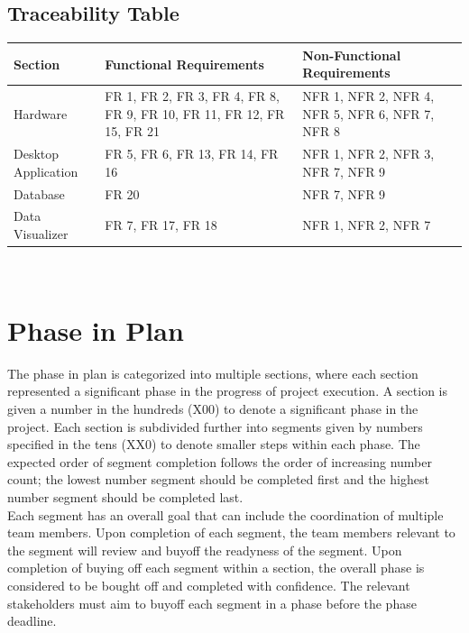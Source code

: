 \documentclass[12pt]{article}
\begin{document}
\subsection{Traceability Table}

  \begin{tabular}{| p{} | p{}| p{}|}
    \hline
    \rowcolor[gray]{0.9}
    Section & Functional Requirements & Non-Functional Requirements\\
    \hline
    Hardware & FR 1, FR 2, FR 3, FR 4, FR 8, FR 9, FR 10, FR 11, FR 12, FR 15, FR 21 & NFR 1, NFR 2, NFR 4, NFR  5, NFR 6, NFR 7, NFR 8 \\
    \hline
    Desktop Application & FR 5, FR 6, FR 13, FR 14, FR 16 & NFR 1, NFR 2, NFR 3, NFR 7, NFR 9\\
    \hline
    Database & FR 20 & NFR 7, NFR 9\\
    \hline
    Data Visualizer & FR 7, FR 17, FR 18 & NFR 1, NFR 2, NFR 7\\
    \hline
  \end{tabular}
\\

\section{Phase in Plan}

The phase in plan is categorized into multiple sections, where each section represented a significant phase in the progress of project execution. A section is given a number in the hundreds (X00) to denote a significant phase in the project. Each section is subdivided further into segments given by numbers specified in the tens (XX0) to denote smaller steps within each phase. The expected order of segment completion follows the order of increasing number count; the lowest number segment should be completed first and the highest number segment should be completed last.\\

Each segment has an overall goal that can include the coordination of multiple team members. Upon completion of each segment, the team members relevant to the segment will review and buyoff the readyness of the segment. Upon completion of buying off each segment within a section, the overall phase is considered to be bought off and completed with confidence. The relevant stakeholders must aim to buyoff each segment in a phase before the phase deadline.\\
\end{document}
